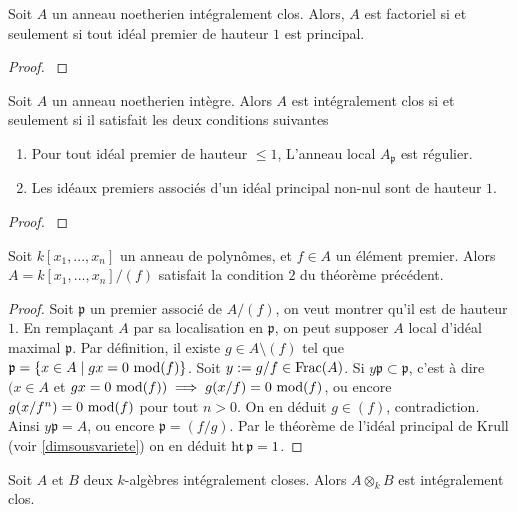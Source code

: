 \begin{thm}\label{UFDPID}
Soit $A$ un anneau noetherien intégralement clos. Alors,
$A$ est factoriel si et seulement si tout idéal premier de hauteur $1$ est principal.
\end{thm}
\begin{proof}
\cite[20.1]{Matsumura} 
\end{proof}

\begin{thm}\label{SerreCritere}
Soit $A$ un anneau noetherien intègre. Alors $A$ est intégralement clos si et seulement si il satisfait les deux conditions suivantes
\begin{enumerate}
\item Pour tout idéal premier de hauteur $\leq 1$, L'anneau local $A_\mathfrak{p}$ est régulier.
\item Les idéaux premiers associés d'un idéal principal non-nul sont de hauteur $1$.
\end{enumerate}
\end{thm}
\begin{proof}
\cite[23.8]{Matsumura} 
\end{proof}

\begin{prop}\label{SerreCritere2}
Soit $k[x_1,...,x_n]$ un anneau de polynômes, et $f\in A$ un élément premier. Alors $A=k[x_1,...,x_n]/(f)$ satisfait la condition $2$ du théorème précédent. 
\end{prop}
\begin{proof}
Soit $\mathfrak{p}$ un premier associé de $A/(f)$, on veut montrer qu'il est de hauteur $1$. En remplaçant $A$ par sa localisation en $\mathfrak{p}$, on peut supposer $A$ local d'idéal maximal $\mathfrak{p}$. Par définition, il existe $g\in A\setminus (f) $ tel que $\mathfrak{p}=\lbrace x\in A\mid gx=0 \,\operatorname{mod} (f)\rbrace$. Soit $y:=g/f\in \operatorname{Frac}(A)$. Si $y\mathfrak{p}\subset\mathfrak{p}$, c'est à dire $(x\in A$ et $gx=0 \,\operatorname{mod} (f))\implies g(x/f)=0\,\operatorname{mod} (f)$, ou encore $g(x/f^n)=0\,\operatorname{mod} (f)$ pour tout $n>0$. On en déduit $g\in (f)$, contradiction. Ainsi $y\mathfrak{p}=A$, ou encore $\mathfrak{p}=(f/g)$. Par le théorème de l'idéal principal de Krull (voir \ref{dimsousvariete}) on en déduit $\operatorname{ht} \mathfrak{p}=1$.
\end{proof}

\begin{prop}\label{tensorproductNormalDomain}
Soit $A$ et $B$ deux $k$-algèbres intégralement closes. Alors $A\otimes_k B$ est intégralement clos.
\end{prop}


